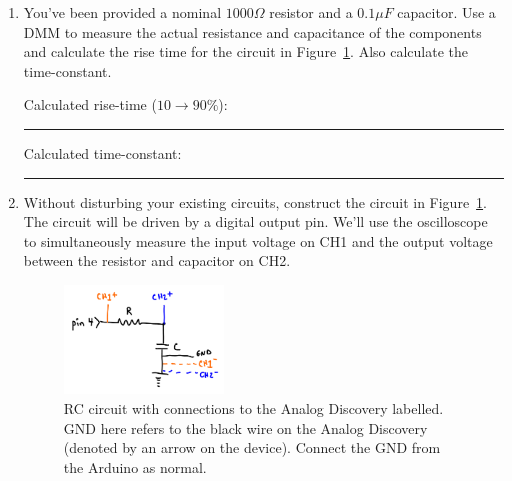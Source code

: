 \documentclass[11pt]{article} %
\begin{document}
\begin{enumerate}
\item You’ve been provided a nominal $1000\Omega$ resistor and a $0.1\mu F$ capacitor. Use a DMM to measure the actual resistance and capacitance of the components and calculate the rise time for the circuit in Figure~\ref{fig:rc.circuit}. Also calculate the time-constant.

\vspace{0.25in}
Calculated rise-time ($10\rightarrow 90\%$): \rule{2in}{0.4pt}

\vspace{0.25in}
Calculated time-constant: \rule{2in}{0.4pt}
\vspace{0.25in}

\item Without disturbing your existing circuits, construct the circuit in Figure~\ref{fig:rc.circuit}. The circuit will be driven by a digital output pin. We'll use the oscilloscope to simultaneously measure the input voltage on CH1 and the output voltage between the resistor and capacitor on CH2.
\begin{figure}[h]
\centering
\includegraphics[width=0.4\textwidth ]{figures/RC_circuit_digilent.png}
\caption{RC circuit with connections to the Analog Discovery labelled. GND here refers to the black wire on the Analog Discovery (denoted by an arrow on the device). Connect the GND from the Arduino as normal.}
\label{fig:rc.circuit}
\end{figure}


\end{enumerate}
\end{document}
